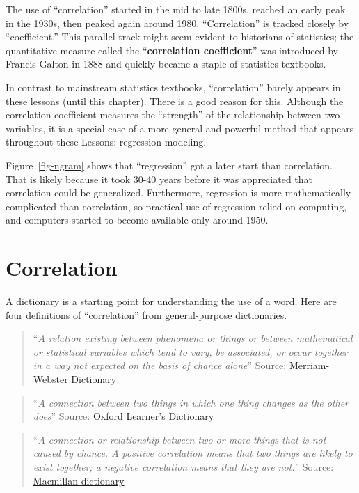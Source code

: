 \documentclass[
  letterpaper,
  DIV=11,
  numbers=noendperiod,
  oneside]{scrreprt}
\begin{document}
The use of ``correlation'' started in the mid to late 1800s, reached an
early peak in the 1930s, then peaked again around 1980. ``Correlation''
is tracked closely by ``coefficient.'' This parallel track might seem
evident to historians of statistics; the quantitative measure called the
``\textbf{correlation coefficient}'' was introduced by Francis Galton in
1888 and quickly became a staple of statistics textbooks.

In contrast to mainstream statistics textbooks, ``correlation'' barely
appears in these lessons (until this chapter). There is a good reason
for this. Although the correlation coefficient measures the ``strength''
of the relationship between two variables, it is a special case of a
more general and powerful method that appears throughout these Lessons:
regression modeling.

Figure~\ref{fig-ngram} shows that ``regression'' got a later start than
correlation. That is likely because it took 30-40 years before it was
appreciated that correlation could be generalized. Furthermore,
regression is more mathematically complicated than correlation, so
practical use of regression relied on computing, and computers started
to become available only around 1950.

\hypertarget{correlation}{%
\section{Correlation}\label{correlation}}

A dictionary is a starting point for understanding the use of a word.
Here are four definitions of ``correlation'' from general-purpose
dictionaries.

\begin{quote}
``\emph{A relation existing between phenomena or things or between
mathematical or statistical variables which tend to vary, be associated,
or occur together in a way not expected on the basis of chance alone}''
Source:
\href{https://www.merriam-webster.com/dictionary/correlation}{Merriam-Webster
Dictionary}
\end{quote}

\begin{quote}
``\emph{A connection between two things in which one thing changes as
the other does}'' Source:
\href{https://www.oxfordlearnersdictionaries.com/us/definition/english/correlation}{Oxford
Learner's Dictionary}
\end{quote}

\begin{quote}
``\emph{A connection or relationship between two or more things that is
not caused by chance. A positive correlation means that two things are
likely to exist together; a negative correlation means that they are
not.}'' Source:
\href{https://www.macmillandictionary.com/us/dictionary/american/correlation}{Macmillan
dictionary}
\end{quote}
\end{document}
